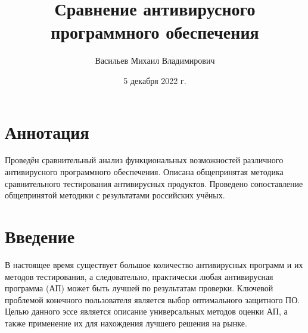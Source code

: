 \documentclass[%
preprint,
amsmath,amssymb,
aps,
]{revtex4-2}
\begin{document}
\title{Сравнение антивирусного программного обеспечения}%



\author{Васильев Михаил Владимирович}
%

\date{5 декабря 2022 г.}%
             



\maketitle


\section{Аннотация}
Проведён сравнительный анализ функциональных возможностей различного антивирусного программного обеспечения. Описана общепринятая методика сравнительного тестирования антивирусных продуктов. Проведено сопоставление общепринятой методики с результатами российских учёных.

\section{Введение}
В настоящее время существует большое количество антивирусных программ и их методов тестирования, а следовательно, практически любая антивирусная программа (АП) может быть лучшей по результатам проверки. Ключевой проблемой конечного пользователя является выбор оптимального защитного ПО. Целью данного эссе является описание универсальных методов оценки АП, а также применение их для нахождения лучшего решения на рынке.
\end{document}
